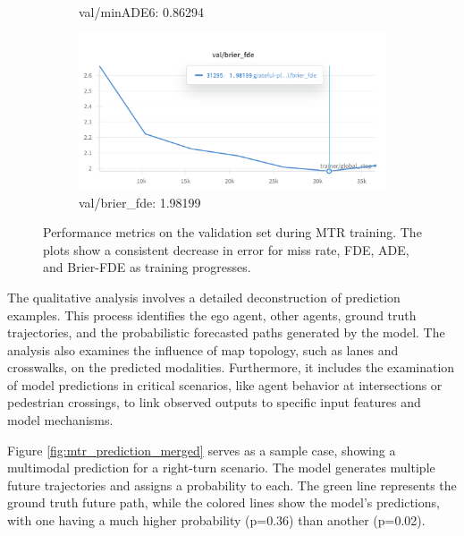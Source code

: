 \begin{figure}[htbp]
\begin{subfigure}[b]{0.48\textwidth}
        \caption{val/minADE6: 0.86294}
    \end{subfigure}
    \hfill
    \begin{subfigure}[b]{0.48\textwidth}
        \centering
        \includegraphics[clip, width=\textwidth]{figures/val_brier_fde.png}
        \caption{val/brier\_fde: 1.98199}
    \end{subfigure}
    \caption{Performance metrics on the validation set during MTR training. The plots show a consistent decrease in error for miss rate, FDE, ADE, and Brier-FDE as training progresses. }
    \label{fig:validation_metrics_merged}
\end{figure}

\label{sec:results_qualitative_merged}
The qualitative analysis involves a detailed deconstruction of prediction examples. This process identifies the ego agent, other agents, ground truth trajectories, and the probabilistic forecasted paths generated by the model. The analysis also examines the influence of map topology, such as lanes and crosswalks, on the predicted modalities. Furthermore, it includes the examination of model predictions in critical scenarios, like agent behavior at intersections or pedestrian crossings, to link observed outputs to specific input features and model mechanisms.

Figure \ref{fig:mtr_prediction_merged} serves as a sample case, showing a multimodal prediction for a right-turn scenario. The model generates multiple future trajectories and assigns a probability to each. The green line represents the ground truth future path, while the colored lines show the model's predictions, with one having a much higher probability (p=0.36) than another (p=0.02).

